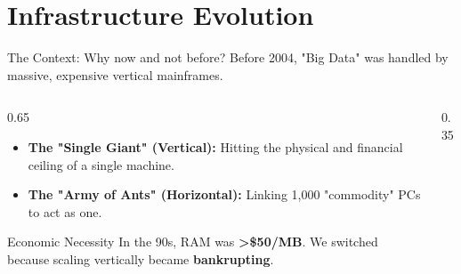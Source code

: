 
\section{Infrastructure Evolution}

\begin{frame}{The Context: Why now and not before?}
    Before 2004, "Big Data" was handled by massive, expensive vertical mainframes. 

    \begin{columns}
        \begin{column}{0.65\textwidth}
            \begin{itemize}
                \item \textbf{The "Single Giant" (Vertical):} 
                    Hitting the physical and financial ceiling of a single machine.
                \item \textbf{The "Army of Ants" (Horizontal):} 
                    Linking 1,000 "commodity" PCs to act as one.
            \end{itemize}
            \vfill
            \begin{alertblock}{Economic Necessity}
                In the 90s, RAM was \textbf{>\$50/MB}. We switched because scaling vertically became \textbf{bankrupting}.
            \end{alertblock}
        \end{column}
        
        \begin{column}{0.35\textwidth}
            \centering
        \end{column}
    \end{columns}
\end{frame}

